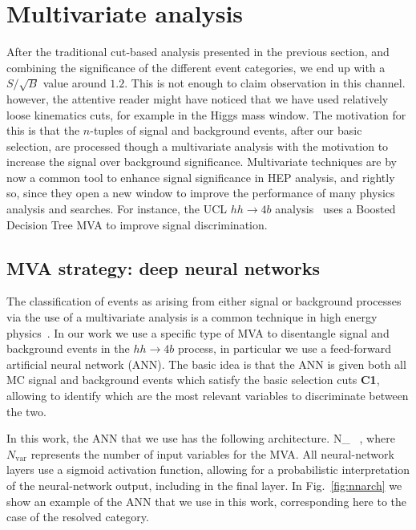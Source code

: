 
\section{Multivariate analysis}
\label{sec:mva}

After the traditional cut-based analysis presented in the previous section,
and combining the significance of the different event categories,
we end up with a $S/\sqrt{B}$ value around $1.2$.
%
This is not enough to claim observation in this channel.
%
however, the attentive reader might have noticed that we have used
relatively 
loose kinematics cuts, for example in the Higgs mass window.
%
The motivation for this is that the $n$-tuples of signal and background
events, after our basic selection, are processed though a multivariate
analysis with the motivation to increase the signal over background
significance.
%
Multivariate techniques are by now a common tool to enhance signal
significance in HEP analysis, and rightly so,
since they open a new window to improve the performance
of many physics analysis and searches.
%
For instance, the UCL $hh\to 4b$ analysis~\cite{Wardrope:2014kya}
uses a Boosted
Decision Tree MVA to improve signal discrimination.

\subsection{MVA strategy: deep neural networks}

The classification of events as arising from either signal or
background processes via the use of a multivariate analysis is a common
technique in high energy physics~\cite{Baldi:2014pta,Wardrope:2014kya}.
%
In our work we use a specific type of  MVA to
disentangle signal and background events in the $hh\to 4b$ process,
in particular we use a feed-forward artificial neural network (ANN).
%
The basic idea is that the ANN is given both all MC signal and background
events which satisfy the basic selection cuts {\bf C1}, allowing to identify
which are the most relevant variables to discriminate between the two.

In this work, the ANN that we use has the following architecture.
\be
\label{eq:nn1}
N_{} \, ,
\ee
where $N_{\mathrm{var}}$ represents the number of input variables for the MVA.
All neural-network layers use a sigmoid activation function, allowing
for a probabilistic
interpretation of the neural-network output, including in the final layer.
%
In Fig.~\ref{fig:nnarch} we show an example of the ANN that we use in this work, corresponding here
to the case of the resolved category.

